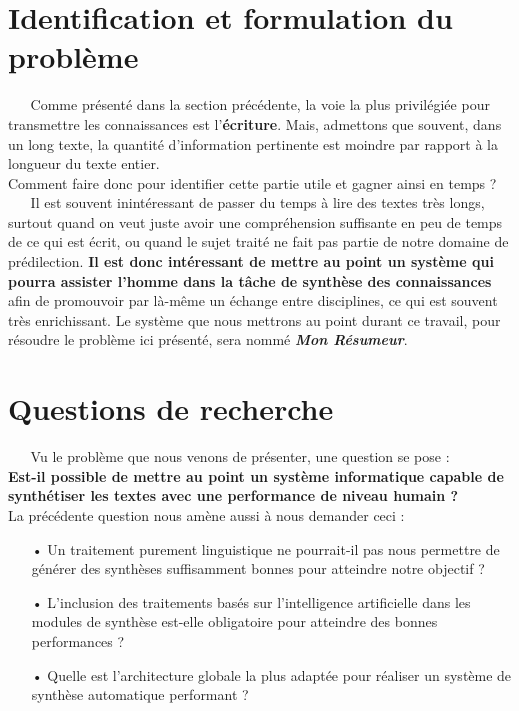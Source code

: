 \section{Identification et formulation du problème}
$ _{} $ $ _{} $ $ _{} $ $ _{} $ $ _{} $Comme présenté dans la section précédente, la voie la plus privilégiée pour transmettre les connaissances est l'\textbf{écriture}. Mais, admettons que souvent, dans un long texte, la quantité d'information pertinente est moindre par rapport à la longueur du texte entier.\\
Comment faire donc pour identifier cette partie utile et gagner ainsi en temps ?\\
$ _{} $ $ _{} $ $ _{} $ $ _{} $ $ _{} $Il est souvent inintéressant de passer du temps à lire des textes très longs, surtout quand on veut juste avoir une compréhension suffisante en peu de temps de ce qui est écrit, ou quand le sujet traité ne fait pas partie de notre domaine de prédilection. \textbf{Il est donc intéressant de mettre au point un système qui pourra assister l'homme dans la tâche de synthèse des connaissances} afin de promouvoir par là-même un échange entre disciplines, ce qui est souvent très enrichissant. Le système que nous mettrons au point durant ce travail, pour résoudre le problème ici présenté, sera nommé \textbf{\textit{Mon Résumeur}}.
\section{Questions de recherche}
$ _{} $ $ _{} $ $ _{} $ $ _{} $ $ _{} $Vu le problème que nous venons de présenter, une question se pose :\\
\textbf{Est-il possible de mettre au point un système informatique capable de synthétiser les textes avec une performance de niveau humain ?}\\
La précédente question nous amène aussi à nous demander ceci :
\begin{itemize}
\item[•] Un traitement purement linguistique ne pourrait-il pas nous permettre de générer des synthèses suffisamment bonnes pour atteindre notre objectif ?
\item[•] L'inclusion des traitements basés sur l'intelligence artificielle dans les modules de synthèse est-elle obligatoire pour atteindre des bonnes performances ?
\item[•] Quelle est l'architecture globale la plus adaptée pour réaliser un système de synthèse automatique performant ?
\end{itemize}
